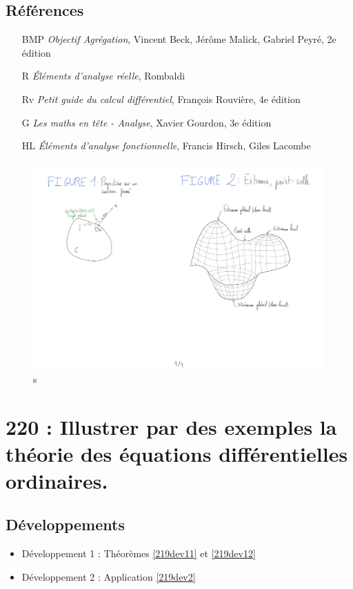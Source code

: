\documentclass[10pt, a4paper, parskip=full, twoside, twocolumn]{report}
\begin{document}
\section*{Références}
\begin{itemize}
	\item[BMP] \emph{Objectif Agrégation}, Vincent Beck, Jérôme Malick, Gabriel Peyré, 2e édition
	\item[R] \emph{Éléments d'analyse réelle}, Rombaldi
	\item[Rv] \emph{Petit guide du calcul différentiel}, François Rouvière, 4e édition
	\item[G] \emph{Les maths en tête - Analyse}, Xavier Gourdon, 3e édition 
	\item[HL] \emph{Éléments d'analyse fonctionnelle}, Francis Hirsch, Giles Lacombe
\end{itemize}

\begin{figure}[!htb]
	\centering
	\includegraphics[trim={0 0 0 0},clip,width=1\linewidth]{img/219.pdf}
	\caption{s}
\end{figure}


\chapter*{220 : Illustrer par des exemples la théorie des équations différentielles ordinaires.}
\setcounter{definition}{0}

\section*{Développements}
\begin{itemize}
	\item Développement 1 : Théorèmes \ref{219dev11} et \ref{219dev12}
	\item Développement 2 : Application \ref{219dev2}
\end{itemize}
\end{document}
